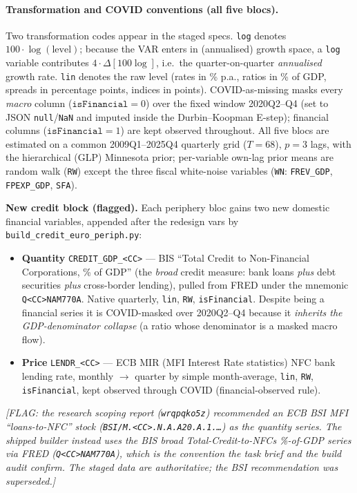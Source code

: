\paragraph{Transformation and COVID conventions (all five blocs).}
Two transformation codes appear in the staged specs. \texttt{log} denotes
$100\cdot\log(\text{level})$; because the VAR enters in (annualised) growth
space, a \texttt{log} variable contributes $4\cdot\Delta[100\log]$, i.e.\ the
quarter-on-quarter \emph{annualised} growth rate. \texttt{lin} denotes the raw
level (rates in \% p.a., ratios in \% of GDP, spreads in percentage points,
indices in points). COVID-as-missing masks every \emph{macro} column
($\texttt{isFinancial}=0$) over the fixed window 2020Q2--Q4 (set to JSON
\texttt{null}/\texttt{NaN} and imputed inside the Durbin--Koopman E-step);
financial columns ($\texttt{isFinancial}=1$) are kept observed throughout.
All five blocs are estimated on a common 2009Q1--2025Q4 quarterly grid
($T=68$), $p=3$ lags, with the hierarchical (GLP) Minnesota prior; per-variable
own-lag prior means are random walk (\texttt{RW}) except the three fiscal
white-noise variables (\texttt{WN}: \texttt{FREV\_GDP}, \texttt{FPEXP\_GDP},
\texttt{SFA}).

\medskip
\noindent\textbf{New credit block (flagged).} Each periphery bloc gains two
new domestic financial variables, appended after the redesign vars by
\texttt{build\_credit\_euro\_periph.py}:
\begin{itemize}[nosep]
  \item \textbf{Quantity} \texttt{CREDIT\_GDP\_<CC>} --- BIS ``Total Credit to
    Non-Financial Corporations, \% of GDP'' (the \emph{broad} credit measure:
    bank loans \emph{plus} debt securities \emph{plus} cross-border lending),
    pulled from FRED under the mnemonic \texttt{Q<CC>NAM770A}. Native
    quarterly, \texttt{lin}, \texttt{RW}, \texttt{isFinancial}. Despite being a
    financial series it is COVID-masked over 2020Q2--Q4 because it
    \emph{inherits the GDP-denominator collapse} (a ratio whose denominator is
    a masked macro flow).
  \item \textbf{Price} \texttt{LENDR\_<CC>} --- ECB MIR (MFI Interest Rate
    statistics) NFC bank lending rate, monthly $\to$ quarter by simple
    month-average, \texttt{lin}, \texttt{RW}, \texttt{isFinancial}, kept
    observed through COVID (financial-observed rule).
\end{itemize}
\textit{[FLAG: the research scoping report (\texttt{wrqpqko5z}) recommended an
ECB BSI MFI ``loans-to-NFC'' \emph{stock} (\texttt{BSI/M.<CC>.\allowbreak N.\allowbreak A.\allowbreak A20.\allowbreak A.1.\dots})
as the quantity series. The shipped builder instead uses the BIS broad
Total-Credit-to-NFCs \%-of-GDP series via FRED (\texttt{Q<CC>NAM770A}), which is
the convention the task brief and the build audit confirm. The staged data are
authoritative; the BSI recommendation was superseded.]}

